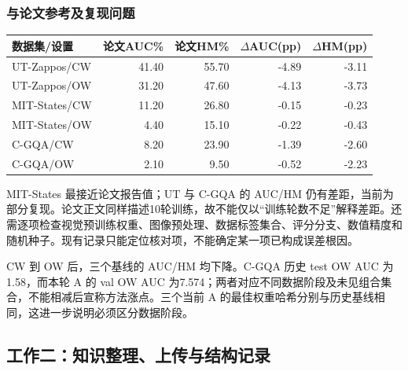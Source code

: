 \documentclass[12pt,a4paper,UTF8]{ctexart}
\newenvironment{reporttable}{\par\smallskip\begingroup\small\centering}{\par\endgroup\smallskip}
\begin{document}
\subsubsection{与论文参考及复现问题}

\begin{reporttable}

\begin{tabularx}{\linewidth}{|Y|r|r|r|r|}
\hline

\textbf{数据集/设置} & \textbf{论文AUC\%} & \textbf{论文HM\%} & \textbf{$\Delta$AUC(pp)} & \textbf{$\Delta$HM(pp)} \\ \hline

UT-Zappos/CW & 41.40 & 55.70 & -4.89 & -3.11 \\ \hline

UT-Zappos/OW & 31.20 & 47.60 & -4.13 & -3.73 \\ \hline

MIT-States/CW & 11.20 & 26.80 & -0.15 & -0.23 \\ \hline

MIT-States/OW & 4.40 & 15.10 & -0.22 & -0.43 \\ \hline

C-GQA/CW & 8.20 & 23.90 & -1.39 & -2.60 \\ \hline

C-GQA/OW & 2.10 & 9.50 & -0.52 & -2.23 \\ \hline

\end{tabularx}\end{reporttable}


MIT-States 最接近论文报告值；UT 与 C-GQA 的 AUC/HM 仍有差距，当前为部分复现。论文正文同样描述10轮训练，故不能仅以“训练轮数不足”解释差距。还需逐项检查视觉预训练权重、图像预处理、数据标签集合、评分分支、数值精度和随机种子。现有记录只能定位核对项，不能确定某一项已构成误差根因。

CW 到 OW 后，三个基线的 AUC/HM 均下降。C-GQA 历史 test OW AUC 为1.58，而本轮 A 的 val OW AUC 为7.574；两者对应不同数据阶段及未见组合集合，不能相减后宣称方法涨点。三个当前 A 的最佳权重哈希分别与历史基线相同，这进一步说明必须区分数据阶段。
\subsection{工作二：知识整理、上传与结构记录}
\end{document}

